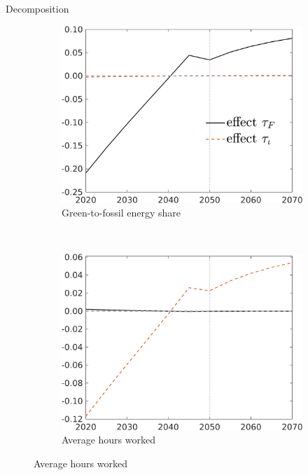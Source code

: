 \documentclass[11pt,aspectratio=169]{beamer}
\begin{document}
\addtocounter{framenumber}{-1}
\begin{frame}{Decomposition}
\centering

\begin{figure}[h!!]
	\centering
	\begin{subfigure}{0.4\textwidth}		
		\caption{\normalsize{Green-to-fossil energy share}}
		\includegraphics[width=1\textwidth]{../codding_model/own_basedOnFried/optimalPol_010922_revision/figures/all_13Sept22_Tplus30/CountTAUF_Both_Opt_target_GFF_nsk0_xgr0_knspil0_regime4_spillover0_sep0_extern0_PV1_etaa0.79_lgd1.png}
	\end{subfigure}
	\begin{minipage}[]{0.1\textwidth}
		\
	\end{minipage}
	\begin{subfigure}{0.4\textwidth}		
		\caption{\normalsize{Average hours worked}}
		\includegraphics[width=1\textwidth]{../codding_model/own_basedOnFried/optimalPol_010922_revision/figures/all_13Sept22_Tplus30/CountTAUF_Both_Opt_target_Hagg_nsk0_xgr0_knspil0_regime4_spillover0_sep0_extern0_PV1_etaa0.79_lgd0.png}

\end{subfigure}
\end{figure}
\end{frame}
\end{document}
